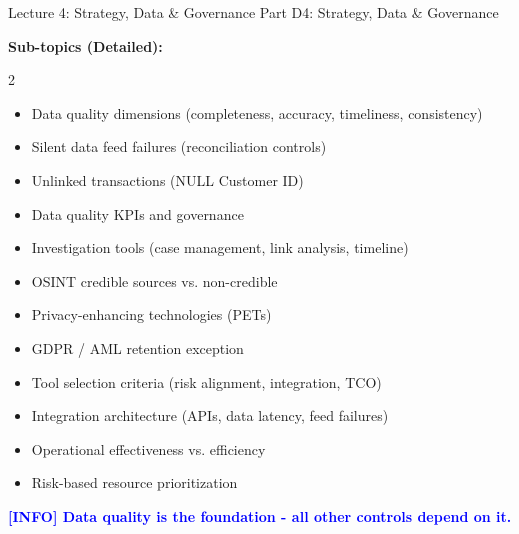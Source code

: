\documentclass[11pt,a4paper]{beamer}
\newcommand{\bluenote}[1]{\textcolor{blue}{\textbf{[INFO] #1}}}
\begin{document}
\begin{frame}{Lecture 4: Strategy, Data \& Governance}
	\centering
	\Large Part D4: Strategy, Data \& Governance
	\vspace{0.3cm}
	
	\textbf{Sub-topics (Detailed):}
	\begin{multicols}{2}
		\begin{itemize}
			\item Data quality dimensions (completeness, accuracy, timeliness, consistency)
			\item Silent data feed failures (reconciliation controls)
			\item Unlinked transactions (NULL Customer ID)
			\item Data quality KPIs and governance
			\item Investigation tools (case management, link analysis, timeline)
			\item OSINT credible sources vs. non-credible
			\item Privacy-enhancing technologies (PETs)
			\item GDPR / AML retention exception
			\item Tool selection criteria (risk alignment, integration, TCO)
			\item Integration architecture (APIs, data latency, feed failures)
			\item Operational effectiveness vs. efficiency
			\item Risk-based resource prioritization
		\end{itemize}
	\end{multicols}
	\bluenote{Data quality is the foundation - all other controls depend on it.}
\end{frame}
\end{document}
